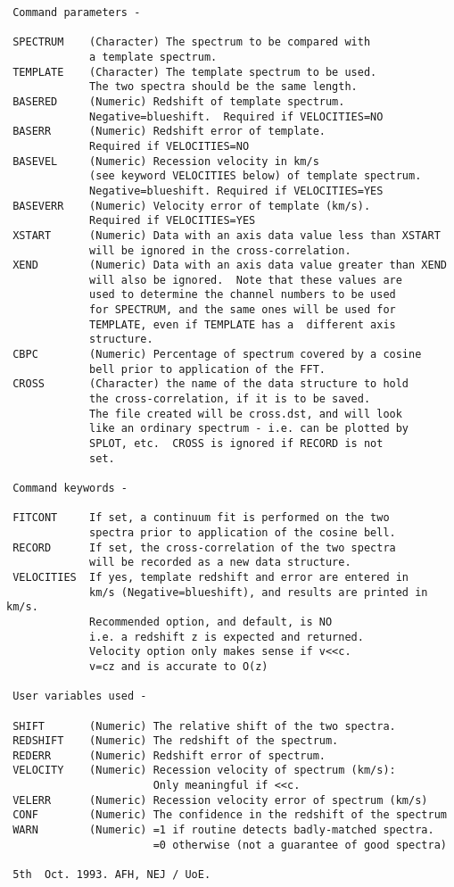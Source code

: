 \begin{description}
\begin{verbatim}
 Command parameters -

 SPECTRUM    (Character) The spectrum to be compared with
             a template spectrum.
 TEMPLATE    (Character) The template spectrum to be used.
             The two spectra should be the same length.
 BASERED     (Numeric) Redshift of template spectrum.
             Negative=blueshift.  Required if VELOCITIES=NO
 BASERR      (Numeric) Redshift error of template.
             Required if VELOCITIES=NO
 BASEVEL     (Numeric) Recession velocity in km/s
             (see keyword VELOCITIES below) of template spectrum.
             Negative=blueshift. Required if VELOCITIES=YES
 BASEVERR    (Numeric) Velocity error of template (km/s).
             Required if VELOCITIES=YES
 XSTART      (Numeric) Data with an axis data value less than XSTART
             will be ignored in the cross-correlation.
 XEND        (Numeric) Data with an axis data value greater than XEND
             will also be ignored.  Note that these values are
             used to determine the channel numbers to be used
             for SPECTRUM, and the same ones will be used for
             TEMPLATE, even if TEMPLATE has a  different axis
             structure.
 CBPC        (Numeric) Percentage of spectrum covered by a cosine
             bell prior to application of the FFT.
 CROSS       (Character) the name of the data structure to hold
             the cross-correlation, if it is to be saved.
             The file created will be cross.dst, and will look
             like an ordinary spectrum - i.e. can be plotted by
             SPLOT, etc.  CROSS is ignored if RECORD is not
             set.

 Command keywords -

 FITCONT     If set, a continuum fit is performed on the two
             spectra prior to application of the cosine bell.
 RECORD      If set, the cross-correlation of the two spectra
             will be recorded as a new data structure.
 VELOCITIES  If yes, template redshift and error are entered in
             km/s (Negative=blueshift), and results are printed in km/s.
             Recommended option, and default, is NO
             i.e. a redshift z is expected and returned.
             Velocity option only makes sense if v<<c.
             v=cz and is accurate to O(z)

 User variables used -

 SHIFT       (Numeric) The relative shift of the two spectra.
 REDSHIFT    (Numeric) The redshift of the spectrum.
 REDERR      (Numeric) Redshift error of spectrum.
 VELOCITY    (Numeric) Recession velocity of spectrum (km/s):
                       Only meaningful if <<c.
 VELERR      (Numeric) Recession velocity error of spectrum (km/s)
 CONF        (Numeric) The confidence in the redshift of the spectrum
 WARN        (Numeric) =1 if routine detects badly-matched spectra.
                       =0 otherwise (not a guarantee of good spectra)

 5th  Oct. 1993. AFH, NEJ / UoE.

\end{verbatim}
\end{description}
